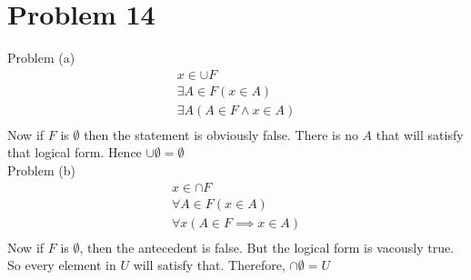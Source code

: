 \documentclass{article}
\begin{document}
\section{Problem 14}
Problem (a)
\begin{align*}
  x \in \cup F \\
  \exists A \in F(x \in A)  \\
  \exists A (A \in F \land x \in A) \\
\end{align*}
Now if $F$ is $\emptyset$ then the statement is obviously false. There
is no $A$ that will satisfy that logical form. Hence $\cup \emptyset =
\emptyset$ \\

Problem (b)
\begin{align*}
  x \in \cap F \\
  \forall A \in F(x \in A) \\
  \forall x (A \in F \implies x \in A) \\
\end{align*}
Now if $F$ is $\emptyset$, then the antecedent is false. But the
logical form is vacously true. So every element in $U$ will satisfy
that. Therefore, $\cap \emptyset = U$
\end{document}
